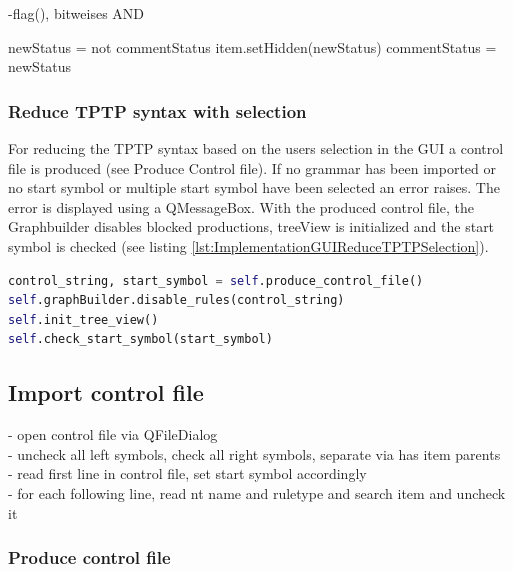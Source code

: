 -flag(), bitweises AND 

\begin{algorithm}[H]
\caption{GUI Algorithm: toggle\textunderscore comments}
\label{alg:toggleComments}
\begin{algorithmic}[1] 
\State newStatus = not commentStatus
		\State item.setHidden(newStatus)
	\EndIf
\EndFor
\State commentStatus = newStatus
\end{algorithmic}
\end{algorithm}

\subsubsection{Reduce \ac{TPTP} syntax with selection}\label{sec:ImplementationGUIReduceWithSelection}

For reducing the \ac{TPTP} syntax based on the users selection in the GUI a control file is produced (see Produce Control file). If no grammar has been imported or no start symbol or multiple start symbol have been selected an error raises. The error is displayed using a QMessageBox. With the produced control file, the Graphbuilder disables blocked productions, treeView is initialized  and the start symbol is checked (see listing \ref{lst:ImplementationGUIReduceTPTPSelection}). 

\begin{lstlisting}[language=Python, basicstyle=\scriptsize	,caption= Reduce TPTP syntax with selection,label= lst:ImplementationGUIReduceTPTPSelection]
control_string, start_symbol = self.produce_control_file()
self.graphBuilder.disable_rules(control_string)
self.init_tree_view()
self.check_start_symbol(start_symbol)
\end{lstlisting}

\subsection{Import control file}\label{sec:ImplementationGUIImportControlFile}
- open control file via QFileDialog \\
- uncheck all left symbols, check all right symbols, separate via has item parents \\
- read first line in control file, set start symbol accordingly  \\
- for each following line, read nt name and ruletype and search item and uncheck it

\subsubsection{Produce control file}\label{sec:ImplementationGUIProduceControlFile}

